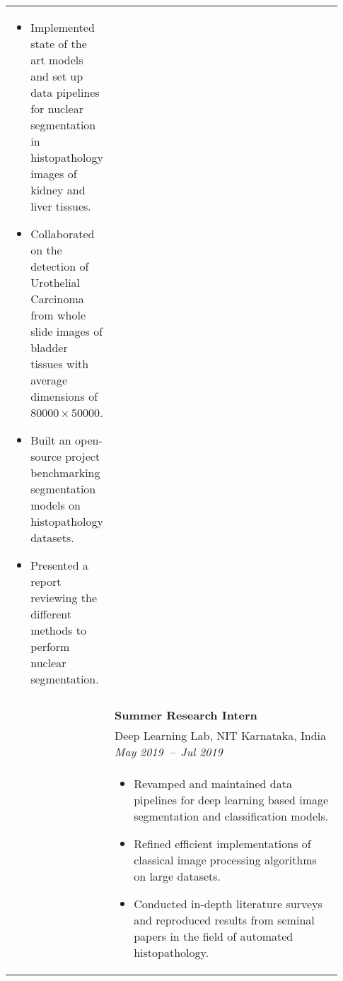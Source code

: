 \documentclass[letterpaper, 10pt, oneside]{article}
\newcommand{\bdit}[1]{{\textbf{#1}}}
\begin{document}
\begin{longtable}{@{} p{0.13\linewidth} p{0.8\linewidth}}
{        \begin{itemize}[leftmargin=*, itemsep=-0.88ex, topsep=-0.88ex]
            \item Implemented state of the art models and set up data pipelines for nuclear segmentation in histopathology images of kidney and liver tissues.
            \item Collaborated on the detection of Urothelial Carcinoma from whole slide images of bladder tissues with average dimensions of $80000\times50000$.
            \item Built an open-source project benchmarking segmentation models on histopathology datasets.
            \item Presented a report reviewing the different methods to perform nuclear segmentation.
        \end{itemize}
    }
    \\
    \\
                                                      & \bdit{Summer Research Intern}                                                                                                                                                                         \\
                                                      & Deep Learning Lab, NIT Karnataka, India \hfill \hspace{-3em} \textsl{May 2019\ --\ Jul 2019}                                                                                                          \\
                                                      & \parbox{0.8\textwidth}{                                                                                                                                                                               %
        \begin{itemize}[leftmargin=*, itemsep=-0.88ex, topsep=-0.88ex]
            \item Revamped and maintained data pipelines for deep learning based image segmentation and classification models.
            \item Refined efficient implementations of classical image processing algorithms on large datasets.
            \item Conducted in-depth literature surveys and reproduced results from seminal papers in the field of automated histopathology.
        \end{itemize}
    }
    \\
    \\


\end{longtable}
\end{document}

